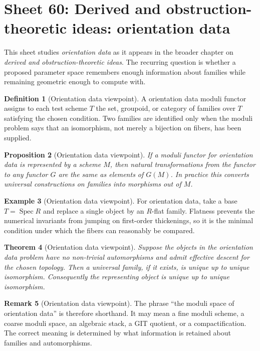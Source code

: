\documentclass[11pt]{amsart}
\newtheorem{theorem}{Theorem}[section]
\newtheorem{proposition}[theorem]{Proposition}
\theoremstyle{definition}
\newtheorem{definition}[theorem]{Definition}
\newtheorem{example}[theorem]{Example}
\newtheorem{remark}[theorem]{Remark}
\newcommand{\Spec}{\operatorname{Spec}}
\begin{document}
\section{Sheet 60: Derived and obstruction-theoretic ideas: orientation data}
This sheet studies \emph{orientation data} as it appears in the broader chapter on \emph{derived and obstruction-theoretic ideas}.  The recurring question is whether a proposed parameter space remembers enough information about families while remaining geometric enough to compute with.
\begin{definition}[Orientation data viewpoint]
A orientation data moduli functor assigns to each test scheme $T$ the set, groupoid, or category of families over $T$ satisfying the chosen condition.  Two families are identified only when the moduli problem says that an isomorphism, not merely a bijection on fibers, has been supplied.
\end{definition}
\begin{proposition}[Orientation data viewpoint]
If a moduli functor for orientation data is represented by a scheme $M$, then natural transformations from the functor to any functor $G$ are the same as elements of $G(M)$.  In practice this converts universal constructions on families into morphisms out of $M$.
\end{proposition}
\begin{example}[Orientation data viewpoint]
For orientation data, take a base $T=\Spec R$ and replace a single object by an $R$-flat family.  Flatness prevents the numerical invariants from jumping on first-order thickenings, so it is the minimal condition under which the fibers can reasonably be compared.
\end{example}
\begin{theorem}[Orientation data viewpoint]
Suppose the objects in the orientation data problem have no non-trivial automorphisms and admit effective descent for the chosen topology.  Then a universal family, if it exists, is unique up to unique isomorphism.  Consequently the representing object is unique up to unique isomorphism.
\end{theorem}
\begin{remark}[Orientation data viewpoint]
The phrase ``the moduli space of orientation data'' is therefore shorthand.  It may mean a fine moduli scheme, a coarse moduli space, an algebraic stack, a GIT quotient, or a compactification.  The correct meaning is determined by what information is retained about families and automorphisms.
\end{remark}
\end{document}
